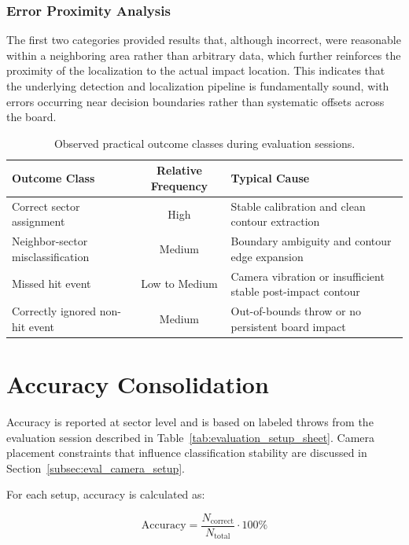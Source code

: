 \subsubsection{Error Proximity Analysis}
The first two categories provided results that, although incorrect, were reasonable within a neighboring area rather than arbitrary data, which further reinforces the proximity of the localization to the actual impact location. This indicates that the underlying detection and localization pipeline is fundamentally sound, with errors occurring near decision boundaries rather than systematic offsets across the board.

\begin{table}[H]
	\centering
	\begin{tabularx}{\linewidth}{@{}X c X@{}}
		\toprule
		\textbf{Outcome Class} & \textbf{Relative Frequency} & \textbf{Typical Cause} \\
		\midrule
		Correct sector assignment & High & Stable calibration and clean contour extraction \\
		Neighbor-sector misclassification & Medium & Boundary ambiguity and contour edge expansion \\
		Missed hit event & Low to Medium & Camera vibration or insufficient stable post-impact contour \\
		Correctly ignored non-hit event & Medium & Out-of-bounds throw or no persistent board impact \\
		\bottomrule
	\end{tabularx}
\caption{Observed practical outcome classes during evaluation sessions.}
\label{tab:observed_outcome_classes}
\end{table}

\section{Accuracy Consolidation}\label{sec:accuracy_consolidation}

Accuracy is reported at sector level and is based on labeled throws from the evaluation session described in Table~\ref{tab:evaluation_setup_sheet}. Camera placement constraints that influence classification stability are discussed in Section~\ref{subsec:eval_camera_setup}.

For each setup, accuracy is calculated as:

\[
\mathrm{Accuracy} = \frac{N_{\mathrm{correct}}}{N_{\mathrm{total}}} \cdot 100\%
\]

\vspace{\baselineskip}


